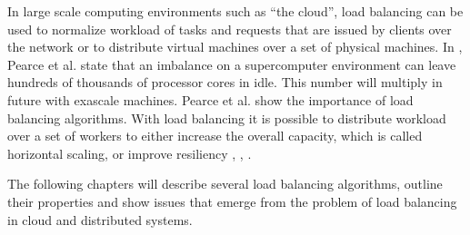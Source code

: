 In large scale computing environments such as ``the cloud'', load balancing can
be used to normalize workload of tasks and requests that are issued by
clients over the network \cite{alakeel2010guide} or to distribute virtual
machines over a set of physical machines.
In \cite{quantif}, Pearce et al. state that an imbalance on a supercomputer
environment can leave hundreds of thousands of processor cores in idle.
This number will multiply in future with exascale machines.
Pearce et al. show the importance of load balancing algorithms.
With load balancing it is possible to distribute workload over a set of workers
to either increase the overall capacity, which is called horizontal scaling,
or improve resiliency \cite{areYouLoadBalancingWrong}, \cite{aTaxonomyAndSurv},
\cite{cloudLBTech}.

The following chapters will describe several load balancing algorithms, outline
their properties and show issues that emerge from the problem of load
balancing in cloud and distributed systems.

